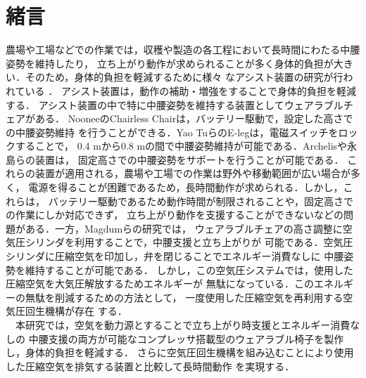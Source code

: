 \section{緒言}
農場や工場などでの作業では，収穫や製造の各工程において長時間にわたる中腰姿勢を維持したり，
立ち上がり動作が求められることが多く身体的負担が大きい．そのため，身体的負担を軽減するために様々
なアシスト装置の研究が行われている
\cite{power1}\cite{power2}\cite{every}\cite{HAL}\cite{BLEEX}\cite{ito}\cite{nori}．
アシスト装置は，動作の補助・増強をすることで身体的負担を軽減する．
アシスト装置の中で特に中腰姿勢を維持する装置としてウェアラブルチェアがある．
NooneeのChairless Chairは，バッテリー駆動で，設定した高さでの中腰姿勢維持
を行うことができる\cite{noonee}．Yao TuらのE-legは，電磁スイッチをロックすることで，
0.4 mから0.8 mの間で中腰姿勢維持が可能である\cite{yao}．Archelisや永島らの装置は，
固定高さでの中腰姿勢をサポートを行うことが可能である\cite{osada1}\cite{kinki}．
これらの装置が適用される，農場や工場での作業は野外や移動範囲が広い場合が多く，
電源を得ることが困難であるため，長時間動作が求められる．しかし，これらは，
バッテリー駆動であるため動作時間が制限されることや，固定高さでの作業にしか対応できず，
立ち上がり動作を支援することができないなどの問題がある．一方，Magdumらの研究では，
ウェアラブルチェアの高さ調整に空気圧シリンダを利用することで，中腰支援と立ち上がりが
可能である．空気圧シリンダに圧縮空気を印加し，弁を閉じることでエネルギー消費なしに
中腰姿勢を維持することが可能である\cite{nita}．
しかし，この空気圧システムでは，使用した圧縮空気を大気圧解放するためエネルギーが
無駄になっている．このエネルギーの無駄を削減するための方法として，
一度使用した圧縮空気を再利用する空気圧回生機構が存在
する\cite{kumakura}\cite{kuma}\cite{sasaki}．\\
　本研究では，空気を動力源とすることで立ち上がり時支援とエネルギー消費なしの
中腰支援の両方が可能なコンプレッサ搭載型のウェアラブル椅子を製作し，身体的負担を軽減する．
さらに空気圧回生機構を組み込むことにより使用した圧縮空気を排気する装置と比較して長時間動作
を実現する．